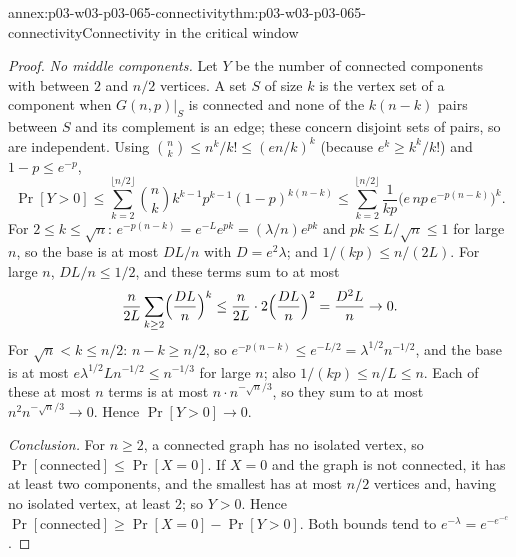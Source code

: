 \begin{annexitem}{annex:p03-w03-p03-065-connectivity}{thm:p03-w03-p03-065-connectivity}{Connectivity in the critical window}
\begin{proof}
\emph{No middle components.}  Let \(Y\) be the number of connected
components with between \(2\) and \(n/2\) vertices.  A set \(S\) of size
\(k\) is the vertex set of a component when \(G(n,p)|_S\) is connected and
none of the \(k(n-k)\) pairs between \(S\) and its complement is an edge;
these concern disjoint sets of pairs, so are independent.  Using
\(\binom nk\leq n^k/k!\leq(en/k)^k\) (because \(e^k\geq k^k/k!\)) and
\(1-p\leq e^{-p}\),
\[
  \Pr[Y>0]\leq\sum_{k=2}^{\lfloor n/2\rfloor}\binom nk k^{k-1}p^{k-1}
  (1-p)^{k(n-k)}
  \leq\sum_{k=2}^{\lfloor n/2\rfloor}\frac1{kp}
  \bigl(e\,np\,e^{-p(n-k)}\bigr)^k .
\]
For \(2\leq k\leq\sqrt n\): \(e^{-p(n-k)}=e^{-L}e^{pk}=(\lambda/n)e^{pk}\)
and \(pk\leq L/\sqrt n\leq1\) for large \(n\), so the base is at most
\(DL/n\) with \(D=e^2\lambda\); and \(1/(kp)\leq n/(2L)\).  For large \(n\),
\(DL/n\leq1/2\), and these terms sum to at most
\[
  \frac n{2L}\sum_{k\geq2}\Bigl(\frac{DL}n\Bigr)^k
  \leq\frac n{2L}\cdot2\Bigl(\frac{DL}n\Bigr)^2=\frac{D^2L}n\to0 .
\]
For \(\sqrt n<k\leq n/2\): \(n-k\geq n/2\), so
\(e^{-p(n-k)}\leq e^{-L/2}=\lambda^{1/2}n^{-1/2}\), and the base is at most
\(e\lambda^{1/2}Ln^{-1/2}\leq n^{-1/3}\) for large \(n\); also
\(1/(kp)\leq n/L\leq n\).  Each of these at most \(n\) terms is at most
\(n\cdot n^{-\sqrt n/3}\), so they sum to at most \(n^2n^{-\sqrt n/3}\to0\).
Hence \(\Pr[Y>0]\to0\).

\emph{Conclusion.}  For \(n\geq2\), a connected graph has no isolated
vertex, so \(\Pr[\text{connected}]\leq\Pr[X=0]\).  If \(X=0\) and the graph
is not connected, it has at least two components, and the smallest has at
most \(n/2\) vertices and, having no isolated vertex, at least \(2\); so
\(Y>0\).  Hence \(\Pr[\text{connected}]\geq\Pr[X=0]-\Pr[Y>0]\).  Both bounds
tend to \(e^{-\lambda}=e^{-e^{-c}}\).
\end{proof}
\end{annexitem}

